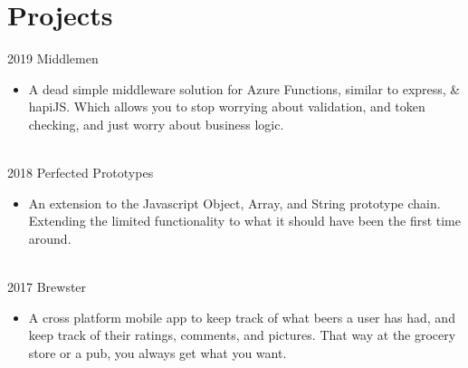 \documentclass[letterpaper]{twentysecondcv} %
\begin{document}
\section{Projects}
\begin{twenty} %

\twentyitem
    	{2019}
		{}
        {Middlemen}
        {}
        {}
        {\begin{itemize}
        \item A dead simple middleware solution for Azure Functions, similar to express, \& hapiJS. Which allows you to stop worrying about validation, and token checking, and just worry about business logic.
        \end{itemize}}
        \\

\twentyitem
    	{2018}
		{}
        {Perfected Prototypes}
        {}
        {}
        {\begin{itemize}
        \item An extension to the Javascript Object, Array, and String prototype chain. Extending the limited functionality to what it should have been the first time around. 
        \end{itemize}}
        \\
\twentyitem
    	{2017}
		{}
        {Brewster}
        {}
        {}
        {\begin{itemize}
        \item A cross platform mobile app to keep track of what beers a user has had, and keep track of their ratings, comments, and pictures. That way at the grocery store or a pub, you always get what you want.
        \end{itemize}}
\end{twenty}
\end{document}

